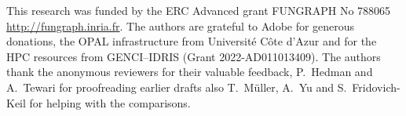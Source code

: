 \documentclass[acmtog]{acmart}
\begin{document}









\begin{acks}
This research was funded by the ERC Advanced grant FUNGRAPH No 788065 \textcolor{blue}{\url{http://fungraph.inria.fr}}. The authors are grateful to Adobe for generous donations, the OPAL infrastructure from Université Côte d’Azur  and for the HPC resources from GENCI–IDRIS (Grant 2022-AD011013409). The authors thank the anonymous reviewers for their valuable feedback, P.\ Hedman and A.\ Tewari for proofreading earlier drafts also T.\ Müller, A.\ Yu and S.\ Fridovich-Keil for helping with the comparisons.
\end{acks}





\end{document}
